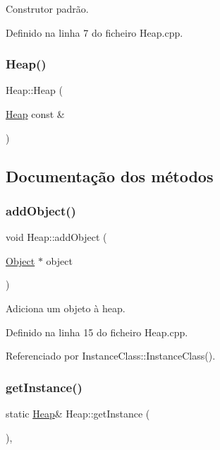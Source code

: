 Construtor padrão. 

Definido na linha 7 do ficheiro Heap.\+cpp.

\mbox{\label{classHeap_aac9a075f0c23c3923fabbf2093386089}} 
\subsubsection{\texorpdfstring{Heap()}{Heap()}\hspace{0.1cm}{\footnotesize\ttfamily [2/2]}}
{\footnotesize\ttfamily Heap\+::\+Heap (\begin{DoxyParamCaption}\item[{\hyperlink{classHeap}{Heap} const \&}]{ }\end{DoxyParamCaption})\hspace{0.3cm}{\ttfamily [private]}}



\subsection{Documentação dos métodos}
\mbox{\label{classHeap_aa2a5f92b36abe24c83853feca936548e}} 
\subsubsection{\texorpdfstring{add\+Object()}{addObject()}}
{\footnotesize\ttfamily void Heap\+::add\+Object (\begin{DoxyParamCaption}\item[{\hyperlink{classObject}{Object} $\ast$}]{object }\end{DoxyParamCaption})}



Adiciona um objeto à heap. 



Definido na linha 15 do ficheiro Heap.\+cpp.



Referenciado por Instance\+Class\+::\+Instance\+Class().

\mbox{\label{classHeap_ac030780aeff8a27e33ed5f5eb576dfda}} 
\subsubsection{\texorpdfstring{get\+Instance()}{getInstance()}}
{\footnotesize\ttfamily static \hyperlink{classHeap}{Heap}\& Heap\+::get\+Instance (\begin{DoxyParamCaption}{ }\end{DoxyParamCaption})\hspace{0.3cm}{\ttfamily [inline]}, {\ttfamily [static]}}



